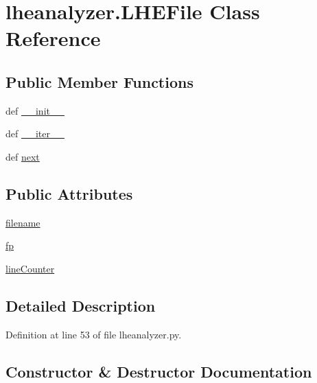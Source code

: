 \section{lheanalyzer.\-L\-H\-E\-File Class Reference}
\label{classlheanalyzer_1_1LHEFile}
\subsection*{Public Member Functions}
\begin{DoxyCompactItemize}
\item 
def \hyperlink{classlheanalyzer_1_1LHEFile_abd40496993cbca0639290046c7674432}{\-\_\-\-\_\-init\-\_\-\-\_\-}
\item 
def \hyperlink{classlheanalyzer_1_1LHEFile_a4bcd63a097f2d068551e38e305efa8d1}{\-\_\-\-\_\-iter\-\_\-\-\_\-}
\item 
def \hyperlink{classlheanalyzer_1_1LHEFile_aed35d600e08733e8af12b7be5da760b1}{next}
\end{DoxyCompactItemize}
\subsection*{Public Attributes}
\begin{DoxyCompactItemize}
\item 
\hyperlink{classlheanalyzer_1_1LHEFile_a4540497f01574a404af5e6c88b778444}{filename}
\item 
\hyperlink{classlheanalyzer_1_1LHEFile_a925cda8d013b284001623d05f895f364}{fp}
\item 
\hyperlink{classlheanalyzer_1_1LHEFile_a829825c01eef6f78b107240b56730aad}{line\-Counter}
\end{DoxyCompactItemize}


\subsection{Detailed Description}


Definition at line 53 of file lheanalyzer.\-py.



\subsection{Constructor \& Destructor Documentation}
